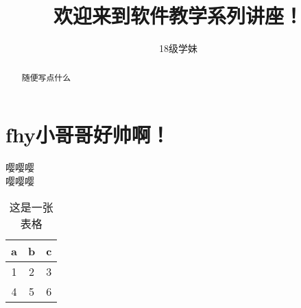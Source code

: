 \documentclass{article}
\title{欢迎来到软件教学系列讲座！}
\author{18级学妹}
\begin{document}
	\maketitle
	\begin{abstract}
		随便写点什么
	\end{abstract}
	\section{fhy小哥哥好帅啊！}
	嘤嘤嘤\\
	嘤嘤嘤
	\begin{table}[h]\caption{这是一张表格}
		\centering
		\begin{tabular}{c|c|c}
			\hline
			a & b & c \\
			\hline
			1 & 2 & 3 \\
			4 & 5 & 6 \\
			\hline
		\end{tabular}
	\end{table}
\end{document}
